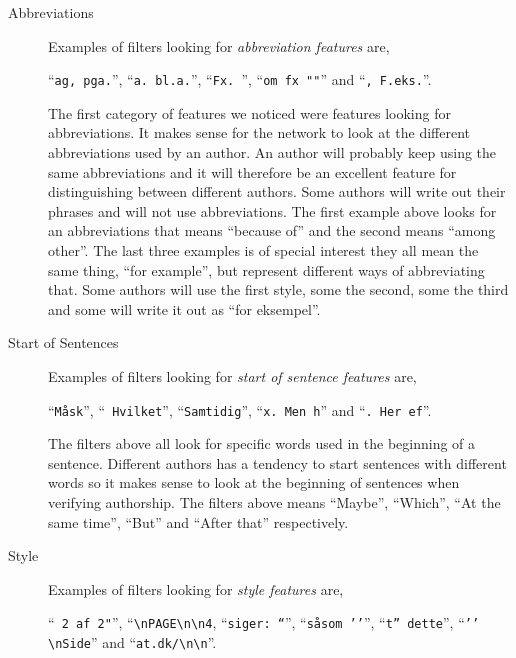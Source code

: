 \begin{description}
    \item[Abbreviations]

        Examples of filters looking for \textit{abbreviation features} are,

        ``\verb|ag, pga.|'', ``\verb|a. bl.a.|'', ``\verb|Fx. |'',
        ``\verb|om fx ""|'' and ``\verb|, F.eks.|''.

        The first category of features we noticed were features looking for
        abbreviations. It makes sense for the network to look at the different
        abbreviations used by an author. An author will probably keep using
        the same abbreviations and it will therefore be an excellent feature
        for distinguishing between different authors. Some authors will write
        out their phrases and will not use abbreviations. The first example
        above looks for an abbreviations that means ``because of'' and the
        second means ``among other''. The last three examples is of special
        interest they all mean the same thing, ``for example'', but represent
        different ways of abbreviating that. Some authors will use the first
        style, some the second, some the third and some will write it out as
        ``for eksempel''.

    \item[Start of Sentences]

        Examples of filters looking for \textit{start of sentence features} are,

        ``\verb|Måsk|'', ``\verb| Hvilket|'', ``\verb|Samtidig|'',
        ``\verb|x. Men h|'' and ``\verb|. Her ef|''.

        The filters above all look for specific words used in the beginning of
        a sentence. Different authors has a tendency to start sentences with
        different words so it makes sense to look at the beginning of sentences
        when verifying authorship. The filters above means ``Maybe'', ``Which'',
        ``At the same time'', ``But'' and ``After that'' respectively.

    \item[Style]

        Examples of filters looking for \textit{style features} are,

        ``\verb| 2 af 2"|'', ``\verb|\nPAGE\n\n4|, ``\verb|siger: “|'',
        ``\verb|såsom ’’|'', ``\verb|t” dette|'', ``\verb|’’ \nSide|'' and
        ``\verb|at.dk/\n\n|''.


\end{description}
